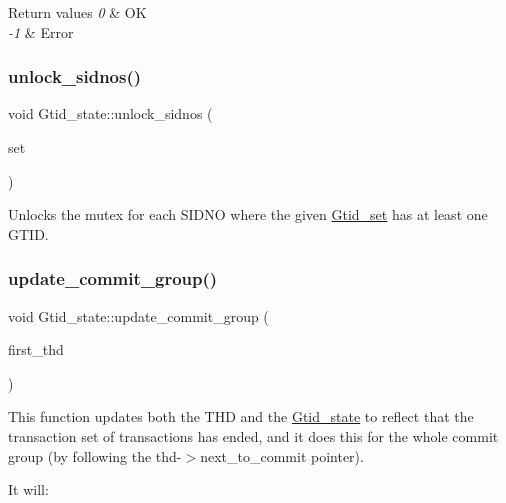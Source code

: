 \begin{DoxyRetVals}{Return values}
{\em 0} & OK \\
\hline
{\em -\/1} & Error \\
\hline
\end{DoxyRetVals}
\mbox{\label{classGtid__state_a1df515758938a44f381c98813130cb94}} 
\subsubsection{\texorpdfstring{unlock\+\_\+sidnos()}{unlock\_sidnos()}}
{\footnotesize\ttfamily void Gtid\+\_\+state\+::unlock\+\_\+sidnos (\begin{DoxyParamCaption}\item[{const \mbox{\hyperlink{classGtid__set}{Gtid\+\_\+set}} $\ast$}]{set }\end{DoxyParamCaption})}

Unlocks the mutex for each S\+I\+D\+NO where the given \mbox{\hyperlink{classGtid__set}{Gtid\+\_\+set}} has at least one G\+T\+ID. \mbox{\label{classGtid__state_a9fa3ed5a9b5fc7d0a4ad5492b657b790}} 
\subsubsection{\texorpdfstring{update\+\_\+commit\+\_\+group()}{update\_commit\_group()}}
{\footnotesize\ttfamily void Gtid\+\_\+state\+::update\+\_\+commit\+\_\+group (\begin{DoxyParamCaption}\item[{T\+HD $\ast$}]{first\+\_\+thd }\end{DoxyParamCaption})}

This function updates both the T\+HD and the \mbox{\hyperlink{classGtid__state}{Gtid\+\_\+state}} to reflect that the transaction set of transactions has ended, and it does this for the whole commit group (by following the thd-\/$>$next\+\_\+to\+\_\+commit pointer).

It will\+:


